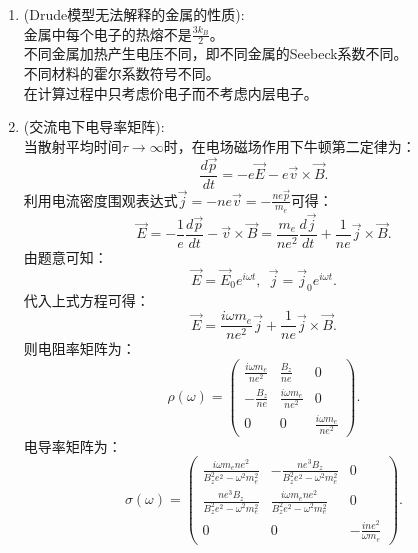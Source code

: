 \documentclass[reqno,a4paper,12pt]{amsart}
\begin{document}
\begin{enumerate}
	\item (Drude模型无法解释的金属的性质): \\
	金属中每个电子的热熔不是$\frac{3k_B}{2}$。 \\
	不同金属加热产生电压不同，即不同金属的Seebeck系数不同。 \\
	不同材料的霍尔系数符号不同。 \\
	在计算过程中只考虑价电子而不考虑内层电子。
	
	\item (交流电下电导率矩阵): \\
	当散射平均时间$\tau \to \infty$时，在电场磁场作用下牛顿第二定律为：
	\[
		\frac{d\vec{p}}{dt} = -e\vec{E} - e\vec{v}\times\vec{B}.
	\]
	利用电流密度围观表达式$\vec{j} = -ne\vec{v} = -\frac{ne\vec{p}}{m_e}$可得：
	\[
		\vec{E} = -\frac{1}{e}\frac{d\vec{p}}{dt} - \vec{v}\times\vec{B} = \frac{m_e}{ne^2}\frac{d\vec{j}}{dt} + \frac{1}{ne}\vec{j}\times\vec{B}.
	\]
	由题意可知：
	\[
		\vec{E} = \vec{E}_0 e^{i\omega t}, ~~ \vec{j} = \vec{j}_0 e^{i\omega t}.
	\]
	代入上式方程可得：
	\[
		\vec{E} = \frac{i\omega m_e}{ne^2}\vec{j} + \frac{1}{ne}\vec{j}\times\vec{B}.
	\]
	则电阻率矩阵为：
	\[
		\rho(\omega) = \begin{pmatrix}
			\frac{i\omega m_e}{ne^2} & \frac{B_z}{ne} & 0 \\
			-\frac{B_z}{ne} & \frac{i\omega m_e}{ne^2} & 0 \\
			0 & 0 & \frac{i\omega m_e}{ne^2} 
		\end{pmatrix}.
	\]
	电导率矩阵为：
	\[
		\sigma(\omega) = \begin{pmatrix}
			\frac{i\omega m_ene^2}{B_z^2e^2-\omega^2m_e^2} & -\frac{ne^3B_z}{B_z^2e^2-\omega^2m_e^2} & 0 \\
			\frac{ne^3B_z}{B_z^2e^2-\omega^2m_e^2} & \frac{i\omega m_ene^2}{B_z^2e^2-\omega^2m_e^2} & 0 \\
			0 & 0 & -\frac{ine^2}{\omega m_e} 
		\end{pmatrix}.
	\]
\end{enumerate}
\end{document}
